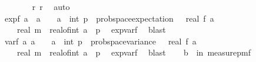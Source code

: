 \begin{isabellebody}
\ \ \ \ \ \ \isamarkupfalse%
\ r{\isacharunderscore}{\kern0pt}{}\ r{\isacharunderscore}{\kern0pt}{}\ \isamarkupfalse%
\ auto\isanewline
\ \ \isamarkupfalse%
\isanewline
\isanewline
\ \ \isamarkupfalse%
\ exp{\isacharunderscore}{\kern0pt}f{\isacharcolon}{\kern0pt}\ {\isachardoublequoteopen}{\isasymAnd}a{\isachardot}{\kern0pt}\ \ a\ {\isasymge}\ {\isacharminus}{\kern0pt}{}\ {\isasymLongrightarrow}\ a\ {\isacharless}{\kern0pt}\ int\ p\ {\isasymLongrightarrow}\ prob{\isacharunderscore}{\kern0pt}space{\isachardot}{\kern0pt}expectation\ {\isasymOmega}\ {\isacharparenleft}{\kern0pt}{\isasymlambda}{\isasymomega}{\isachardot}{\kern0pt}\ real\ {\isacharparenleft}{\kern0pt}f\ a\ {\isasymomega}{\isacharparenright}{\kern0pt}{\isacharparenright}{\kern0pt}\ {\isacharequal}{\kern0pt}\isanewline
\ \ \ \ real\ m\ {\isacharasterisk}{\kern0pt}\ {\isacharparenleft}{\kern0pt}real{\isacharunderscore}{\kern0pt}of{\isacharunderscore}{\kern0pt}int\ a{\isacharplus}{\kern0pt}{}{\isacharparenright}{\kern0pt}\ {\isacharslash}{\kern0pt}\ p{\isachardoublequoteclose}\ \isamarkupfalse%
\ exp{\isacharunderscore}{\kern0pt}var{\isacharunderscore}{\kern0pt}f\ \isamarkupfalse%
\ blast\isanewline
\isanewline
\ \ \isamarkupfalse%
\ var{\isacharunderscore}{\kern0pt}f{\isacharcolon}{\kern0pt}\ {\isachardoublequoteopen}{\isasymAnd}a{\isachardot}{\kern0pt}\ a\ {\isasymge}\ {\isacharminus}{\kern0pt}{}\ {\isasymLongrightarrow}\ a\ {\isacharless}{\kern0pt}\ int\ p\ {\isasymLongrightarrow}\ prob{\isacharunderscore}{\kern0pt}space{\isachardot}{\kern0pt}variance\ {\isasymOmega}\ {\isacharparenleft}{\kern0pt}{\isasymlambda}{\isasymomega}{\isachardot}{\kern0pt}\ real\ {\isacharparenleft}{\kern0pt}f\ a\ {\isasymomega}{\isacharparenright}{\kern0pt}{\isacharparenright}{\kern0pt}\ {\isasymle}\isanewline
\ \ \ \ real\ m\ {\isacharasterisk}{\kern0pt}\ {\isacharparenleft}{\kern0pt}real{\isacharunderscore}{\kern0pt}of{\isacharunderscore}{\kern0pt}int\ a{\isacharplus}{\kern0pt}{}{\isacharparenright}{\kern0pt}\ {\isacharslash}{\kern0pt}\ p{\isachardoublequoteclose}\ \isamarkupfalse%
\ exp{\isacharunderscore}{\kern0pt}var{\isacharunderscore}{\kern0pt}f\ \isamarkupfalse%
\ blast\isanewline
\isanewline
\ \ \isamarkupfalse%
\ b{\isacharcolon}{\kern0pt}\ {\isachardoublequoteopen}{\isasymP}{\isacharparenleft}{\kern0pt}{\isasymomega}\ in\ measure{\isacharunderscore}{\kern0pt}pmf\ {\isasymOmega}\ \isanewline

\end{isabellebody}
